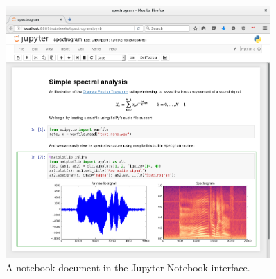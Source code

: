 \begin{figure}[ht]\centering
  \centering
  \includegraphics[width=0.9\textwidth]{spectrogram_smaller.png}
  \caption{A notebook document in the Jupyter Notebook interface.}\label{fig:notebook-screenshot}
\end{figure}

